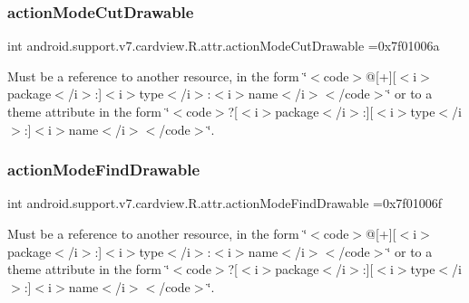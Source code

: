\subsubsection{\texorpdfstring{action\+Mode\+Cut\+Drawable}{actionModeCutDrawable}}
{\footnotesize\ttfamily int android.\+support.\+v7.\+cardview.\+R.\+attr.\+action\+Mode\+Cut\+Drawable =0x7f01006a\hspace{0.3cm}{\ttfamily [static]}}

Must be a reference to another resource, in the form \char`\"{}$<$code$>$@\mbox{[}+\mbox{]}\mbox{[}$<$i$>$package$<$/i$>$\+:\mbox{]}$<$i$>$type$<$/i$>$\+:$<$i$>$name$<$/i$>$$<$/code$>$\char`\"{} or to a theme attribute in the form \char`\"{}$<$code$>$?\mbox{[}$<$i$>$package$<$/i$>$\+:\mbox{]}\mbox{[}$<$i$>$type$<$/i$>$\+:\mbox{]}$<$i$>$name$<$/i$>$$<$/code$>$\char`\"{}. \mbox{\label{classandroid_1_1support_1_1v7_1_1cardview_1_1R_1_1attr_a494f7701e17a6f850787e8abce6489ad}} 
\subsubsection{\texorpdfstring{action\+Mode\+Find\+Drawable}{actionModeFindDrawable}}
{\footnotesize\ttfamily int android.\+support.\+v7.\+cardview.\+R.\+attr.\+action\+Mode\+Find\+Drawable =0x7f01006f\hspace{0.3cm}{\ttfamily [static]}}

Must be a reference to another resource, in the form \char`\"{}$<$code$>$@\mbox{[}+\mbox{]}\mbox{[}$<$i$>$package$<$/i$>$\+:\mbox{]}$<$i$>$type$<$/i$>$\+:$<$i$>$name$<$/i$>$$<$/code$>$\char`\"{} or to a theme attribute in the form \char`\"{}$<$code$>$?\mbox{[}$<$i$>$package$<$/i$>$\+:\mbox{]}\mbox{[}$<$i$>$type$<$/i$>$\+:\mbox{]}$<$i$>$name$<$/i$>$$<$/code$>$\char`\"{}. \mbox{\label{classandroid_1_1support_1_1v7_1_1cardview_1_1R_1_1attr_ac766dac9eccbe79b90d7776b8f7c2b26}} 
